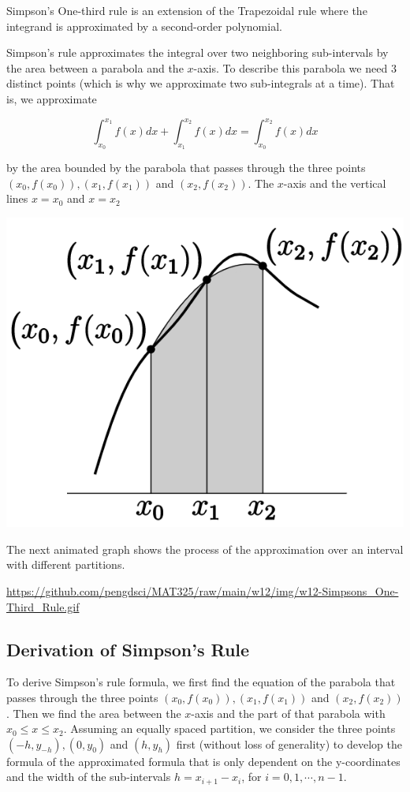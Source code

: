 \documentclass[
]{book}
\begin{document}
Simpson's One-third rule is an extension of the Trapezoidal rule where the integrand is approximated by a second-order polynomial.

Simpson's rule approximates the integral over two neighboring sub-intervals by the area between a parabola and the \(x\)-axis. To describe this parabola we need \(3\) distinct points (which is why we approximate two sub-integrals at a time). That is, we approximate

\[
\int_{x_0}^{x_1} f(x) dx + \int_{x_1}^{x_2}f(x) dx = \int_{x_0}^{x_2}f(x)dx
\]

by the area bounded by the parabola that passes through the three points \((x_0, f(x_0)), (x_1, f(x_1))\) and \((x_2, f(x_2))\). The \(x\)-axis and the vertical lines \(x = x_0\) and \(x = x_2\)

\begin{center}\includegraphics[width=0.45\linewidth]{img12/w12-SimpsonOneThirdRule} \end{center}

\hfill\break

The next animated graph shows the process of the approximation over an interval with different partitions.

\url{https://github.com/pengdsci/MAT325/raw/main/w12/img/w12-Simpsons_One-Third_Rule.gif}

\hfill\break

\hypertarget{derivation-of-simpsons-rule}{%
\subsection{Derivation of Simpson's Rule}\label{derivation-of-simpsons-rule}}

To derive Simpson's rule formula, we first find the equation of the parabola that passes through the three points \((x_0, f(x_0)), (x_1, f(x_1))\) and \((x_2, f(x_2))\). Then we find the area between the \(x\)-axis and the part of that parabola with \(x_0 \le x \le x_2\). Assuming an equally spaced partition, we consider the three points \((-h, y_{-h}), (0, y_0)\) and \((h, y_h)\) first (without loss of generality) to develop the formula of the approximated formula that is only dependent on the y-coordinates and the width of the sub-intervals \(h = x_{i+1} - x_i\), for \(i = 0, 1, \cdots, n-1\).
\end{document}
